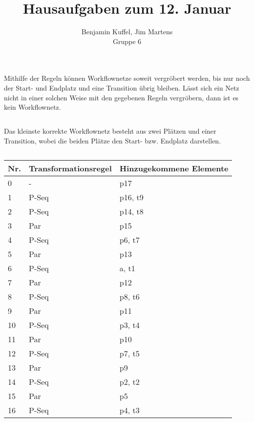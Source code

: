 \documentclass[10pt,a4paper,oneside,ngerman,numbers=noenddot]{scrartcl}
\begin{document}
\author{Benjamin Kuffel, Jim Martens\\Gruppe 6}
\title{Hausaufgaben zum 12. Januar}
\maketitle

\setcounter{section}{2}
\section{} %
\subsection{}
Mithilfe der Regeln können Workflownetze soweit vergröbert werden, bis nur noch der Start- und Endplatz und eine Transition übrig bleiben. Lässt sich ein Netz nicht in einer solchen Weise mit den gegebenen Regeln vergröbern, dann ist es kein Workflownetz.

\subsection{}
Das kleinste korrekte Workflownetz besteht aus zwei Plätzen und einer Transition, wobei die beiden Plätze den Start- bzw. Endplatz darstellen.

\setcounter{subsection}{3}
\subsection{}
\begin{tabular}{l|l|l}
    Nr. & Transformationsregel & Hinzugekommene Elemente \\
    \hline
    0 & - & p17 \\
    1 & P-Seq & p16, t9 \\
    2 & P-Seq & p14, t8 \\
    3 & Par & p15 \\
    4 & P-Seq & p6, t7 \\
    5 & Par & p13 \\
    6 & P-Seq & a, t1 \\
    7 & Par & p12 \\
    8 & P-Seq & p8, t6 \\
    9 & Par & p11 \\
    10 & P-Seq & p3, t4 \\
    11 & Par & p10 \\
    12 & P-Seq & p7, t5 \\
    13 & Par & p9 \\
    14 & P-Seq & p2, t2 \\
    15 & Par & p5 \\
    16 & P-Seq & p4, t3
\end{tabular}
\end{document}
